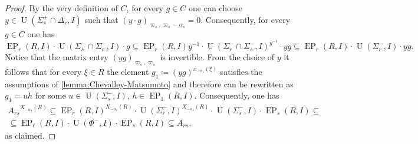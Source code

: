 \documentclass[11pt]{amsart}
\theoremstyle{plain}
\numberwithin{equation}{section}
\numberwithin{lemma}{section}
\theoremstyle{definition}
\theoremstyle{remark}
\DeclareMathOperator{\EP}{EP}
\DeclareMathOperator{\U}{U}
\begin{document}
\begin{proof}
By the very definition of $C$, for every $g \in C$ one can choose $y \in \U(\Sigma_s^+ \cap \Delta_r, I)$ such that $(y \cdot g)_{\varpi_s, \varpi_s - \alpha_s} = 0$.
Consequently, for every $g\in C$ one has
\[
 \EP_r(R, I) \cdot \U(\Sigma_s^- \cap \Sigma_r^-, I) \cdot g \subseteq \EP_r(R, I) y^{-1} \cdot \U(\Sigma_r^-\cap \Sigma_s^-, I)^{y^{-1}} \cdot y g
  \subseteq \EP_r(R, I) \cdot \U(\Sigma_r^-, I) \cdot y g.
\]
Notice that the matrix entry $(yg)_{\varpi_s, \varpi_s}$ is invertible.
From the choice of $y$ it follows that for every $\xi\in R$ the element $g_1 \coloneqq (yg)^{x_{-\alpha_s}(\xi)}$
satisfies the assumptions of \cref{lemma:Chevalley-Matsumoto} and therefore can be rewritten as $g_1 = uh$ for some $u \in \U(\Sigma_s^-, I)$, $h \in \EP_1(R, I)$.
Consequently, one has
\begin{multline*} {A_{rs}}^{X_{-\alpha_{s}}(R)} \subseteq \EP_r(R, I)^{X_{-\alpha_{s}}(R)} \cdot \U(\Sigma_r^-, I)^{X_{-\alpha_{s}}(R)} \cdot \U(\Sigma_s^-, I) \cdot \EP_s(R, I) \subseteq \\
\subseteq \EP_\ell(R, I) \cdot \U(\Phi^-, I) \cdot \EP_s(R, I) \subseteq A_{rs}, \end{multline*}
as claimed.
\end{proof}
\end{document}
